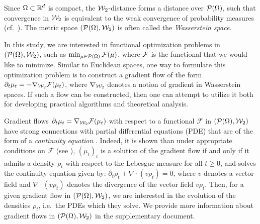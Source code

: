 Since $\Omega \subset \mathbb{R}^d$ is compact, the ${\cal W}_2$-distance forms a distance over ${\cal P}(\Omega)$, such that convergence in ${\cal W}_2$ is equivalent to the weak convergence of probability measures (cf.\ \cite[Theorem 2.1]{santambrogio2010introduction}). The metric space $({\cal P}(\Omega),{\cal W}_2) $ is often called the \emph{Wasserstein space}.

In this study, we are interested in functional optimization problems in $({\cal P}(\Omega),{\cal W}_2)$, such as $\min_{\mu\in{\cal P}(\Omega)} {\cal F}(\mu)$, where ${\cal F}$ is the functional that we would like to minimize. Similar to Euclidean spaces, one way to formulate this optimization problem is to construct a gradient flow of the form $\partial_t \mu_t = - \nabla_{{\cal W}_2} {\cal F}(\mu_t)$, where $\nabla_{{\cal W}_2}$ denotes a notion of gradient in Wasserstein spaces. If such a flow can be constructed, then one can attempt to utilize it both for developing practical algorithms and theoretical analysis.

Gradient flows $\partial_t \mu_t = \nabla_{{\cal W}_2} \mathcal{F}(\mu_t)$ with respect to a functional $\mathcal{F}$ in $({\cal P}(\Omega),{\cal W}_2)$ have strong connections with partial differential equations (PDE) that are of the form of a \emph{continuity equation} \cite{santambrogio2017euclidean}. Indeed, it is shown than under appropriate conditions on $\mathcal{F}$ (see \eg \cite{ambrosio2008gradient}), $(\mu_t)_t$ is a solution of the gradient flow if and only if it admits a density $\rho_t$ with respect to the Lebesgue measure for all $t \geq 0$, and solves the continuity equation given by:
$\partial_t \rho_t + \nabla \cdot (v \rho_t) = 0$, %
where $v$ denotes a vector field and $\nabla \cdot (v \rho_t)$ denotes the divergence of the vector field $v\rho_t$. Then, for a given gradient flow in $({\cal P}(\Omega),{\cal W}_2)$, we are interested in the evolution of the densities $\rho_t$, i.e.\ the PDEs which they solve.
%
We provide more information about gradient flows in $({\cal P}(\Omega),{\cal W}_2)$ in the supplementary document.

